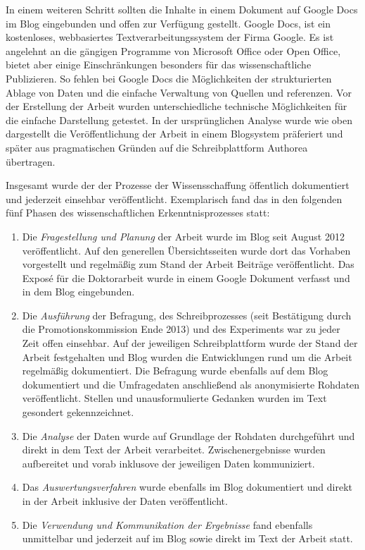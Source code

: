 In einem weiteren Schritt sollten die Inhalte in einem Dokument auf Google Docs im Blog eingebunden und offen zur Verfügung gestellt. Google Docs, ist ein kostenloses, webbasiertes Textverarbeitungssystem der Firma Google. Es ist angelehnt an die gängigen Programme von Microsoft Office oder Open Office, bietet aber einige Einschränkungen besonders für das wissenschaftliche Publizieren. So fehlen bei Google Docs die Möglichkeiten der strukturierten Ablage von Daten und die einfache Verwaltung von Quellen und referenzen. Vor der Erstellung der Arbeit wurden unterschiedliche technische Möglichkeiten für die einfache Darstellung getestet. In der ursprünglichen Analyse wurde wie oben dargestellt die Veröffentlichung der Arbeit in einem Blogsystem präferiert und später aus pragmatischen Gründen auf die Schreibplattform Authorea übertragen.

Insgesamt wurde der der Prozesse der Wissensschaffung öffentlich dokumentiert und jederzeit einsehbar veröffentlicht. Exemplarisch fand das in den folgenden fünf Phasen des wissenschaftlichen Erkenntnisprozesses statt:
\begin{enumerate}
\item Die \textit{Fragestellung und Planung} der Arbeit wurde im Blog seit August 2012 veröffentlicht. Auf den generellen Übersichtsseiten wurde dort das Vorhaben vorgestellt und regelmäßig zum Stand der Arbeit Beiträge veröffentlicht. Das Exposé für die Doktorarbeit wurde in einem Google Dokument verfasst und in dem Blog eingebunden.
\item Die \textit{Ausführung} der Befragung, des Schreibprozesses (seit Bestätigung durch die Promotionskommission Ende 2013) und des Experiments war zu jeder Zeit offen einsehbar. Auf der jeweiligen Schreibplattform wurde der Stand der Arbeit festgehalten und Blog wurden die Entwicklungen rund um die Arbeit regelmäßig dokumentiert. Die Befragung wurde ebenfalls auf dem Blog dokumentiert und die Umfragedaten anschließend als anonymisierte Rohdaten veröffentlicht. Stellen und unausformulierte Gedanken wurden im Text gesondert gekennzeichnet.
\item Die \textit{Analyse} der Daten wurde auf Grundlage der Rohdaten durchgeführt und direkt in dem Text der Arbeit verarbeitet. Zwischenergebnisse wurden aufbereitet und vorab inklusove der jeweiligen Daten kommuniziert.
\item Das \textit{Auswertungsverfahren} wurde ebenfalls im Blog dokumentiert und direkt in der Arbeit inklusive der Daten veröffentlicht.
\item Die \textit{Verwendung und Kommunikation der Ergebnisse} fand ebenfalls unmittelbar und jederzeit auf im Blog sowie direkt im Text der Arbeit statt.
\end{enumerate}

